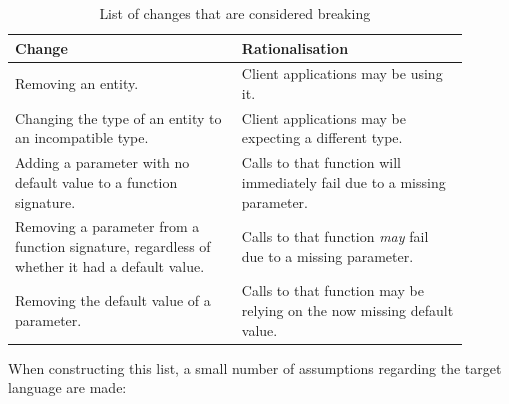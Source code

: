 \documentclass{l4proj}
\begin{document}
\begin{table}[H]
\centering
\caption{List of changes that are considered breaking}
\begin{tabular}{|p{0.45\linewidth}|p{0.45\linewidth}|}
\hline
\textbf{Change}                                                                               & \textbf{Rationalisation}                                                 \\
\hline
Removing an entity.                                                                           & Client applications may be using it.                                       \\
\hline
Changing the type of an entity to an incompatible type.                                       & Client applications may be expecting a different type.                     \\
\hline
Adding a parameter with no default value to a function signature.                             & Calls to that function will immediately fail due to a missing parameter. \\
\hline
Removing a parameter from a function signature, regardless of whether it had a default value. & Calls to that function \textit{may} fail due to a missing parameter.     \\
\hline
Removing the default value of a parameter.                                                    & Calls to that function may be relying on the now missing default value.  \\
\hline
\end{tabular}
\end{table}

When constructing this list, a small number of assumptions
regarding the target language are made:
\end{document}
